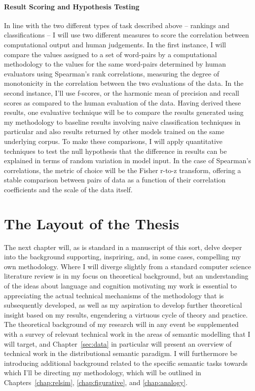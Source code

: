\paragraph{Result Scoring and Hypothesis Testing} In line with the two different types of task described above -- rankings and classifications -- I will use two different measures to score the correlation between computational output and human judgements.  In the first instance, I will compare the values assigned to a set of word-pairs by a computational methodology to the values for the same word-pairs determined by human evaluators using Spearman's rank correlations, measuring the degree of monotonicity in the correlation between the two evaluations of the data.  In the second instance, I'll use f-scores, or the harmonic mean of precision and recall scores as compared to the human evaluation of the data.  Having derived these results, one evaluative technique will be to compare the results generated using my methodology to baseline results involving naive classification techniques in particular and also results returned by other models trained on the same underlying corpus.  To make these comparisons, I will apply quantitative techniques to test the null hypothesis that the difference in results can be explained in terms of random variation in model input.  In the case of Spearman's correlations, the metric of choice will be the Fisher r-to-z transform, offering a stable comparison between pairs of data as a function of their correlation coefficients and the scale of the data itself.

\section{The Layout of the Thesis}
The next chapter will, as is standard in a manuscript of this sort, delve deeper into the background supporting, inspriring, and, in some cases, compelling my own methodology.  Where I will diverge slightly from a standard computer science literature review is in my focus on theoretical background, but an understanding of the ideas about language and cognition motivating my work is essential to appreciating the actual technical mechanisms of the methodology that is subsequently developed, as well as my aspiration to develop further theoretical insight based on my results, engendering a virtuous cycle of theory and practice.  The theoretical background of my research will in any event be supplemented with a survey of relevant technical work in the areas of semantic modelling that I will target, and Chapter~\ref{sec:data} in particular will present an overview of technical work in the distributional semantic paradigm.  I will furthermore be introducing additional background related to the specific semantic tasks towards which I'll be directing my methodology, which will be outlined in Chapters~\ref{chap:relsim}, \ref{chap:figurative}, and \ref{chap:analogy}.

